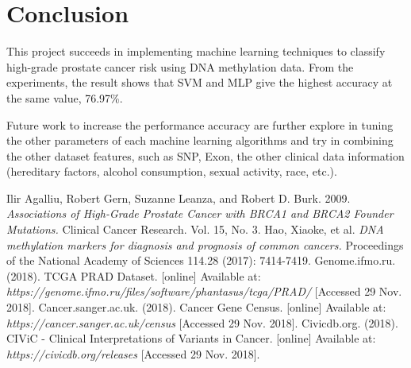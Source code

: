 \documentclass[a4paper,oneside]{article}
\begin{document}
\section{Conclusion}
This project succeeds in implementing machine learning techniques to classify high-grade prostate cancer risk using DNA methylation data. From the experiments, the result shows that SVM and MLP give the highest accuracy at the same value, 76.97\%.
\par
Future work to increase the performance accuracy are further explore in tuning the other parameters of each machine learning algorithms and try in combining the other dataset features, such as SNP, Exon, the other clinical data information (hereditary factors, alcohol consumption, sexual activity, race, etc.).

\begin{thebibliography}{1}
 Ilir Agalliu, Robert Gern, Suzanne Leanza, and Robert D. Burk. 2009. {\em Associations of High-Grade Prostate Cancer with BRCA1 and BRCA2 Founder Mutations.} Clinical Cancer Research. Vol. 15, No. 3.
 Hao, Xiaoke, et al. {\em DNA methylation markers for diagnosis and prognosis of common cancers.} Proceedings of the National Academy of Sciences 114.28 (2017): 7414-7419.
 Genome.ifmo.ru. (2018). TCGA PRAD Dataset. [online] Available at: {\em https://genome.ifmo.ru/files/software/phantasus/tcga/PRAD/ } [Accessed 29 Nov. 2018].
 Cancer.sanger.ac.uk. (2018). Cancer Gene Census. [online] Available at: {\em https://cancer.sanger.ac.uk/census } [Accessed 29 Nov. 2018].
 Civicdb.org. (2018). CIViC - Clinical Interpretations of Variants in Cancer. [online] Available at: {\em https://civicdb.org/releases } [Accessed 29 Nov. 2018].
\end{thebibliography}
\end{document}
